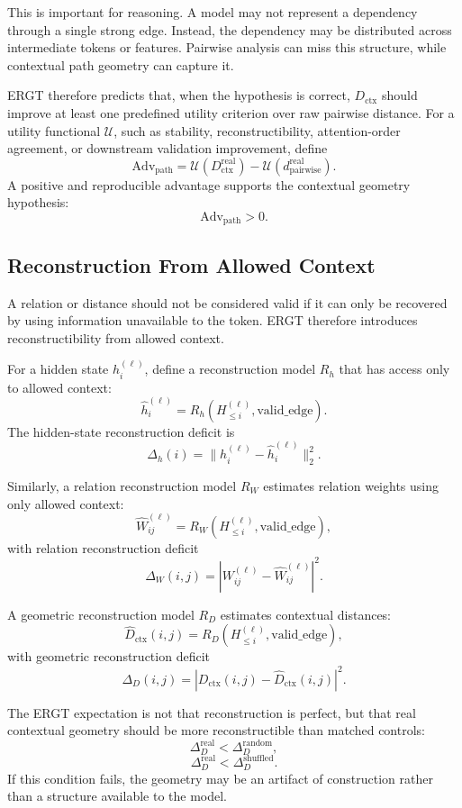 \documentclass[11pt]{article}
\begin{document}
This is important for reasoning. A model may not represent a dependency through a single strong edge. Instead, the dependency may be distributed across intermediate tokens or features. Pairwise analysis can miss this structure, while contextual path geometry can capture it.

ERGT therefore predicts that, when the hypothesis is correct, $D_{\mathrm{ctx}}$ should improve at least one predefined utility criterion over raw pairwise distance. For a utility functional $\mathcal{U}$, such as stability, reconstructibility, attention-order agreement, or downstream validation improvement, define
\[
\mathrm{Adv}_{\mathrm{path}}
=
\mathcal{U}(D_{\mathrm{ctx}}^{\mathrm{real}})
-
\mathcal{U}(d_{\mathrm{pairwise}}^{\mathrm{real}}).
\]
A positive and reproducible advantage supports the contextual geometry hypothesis:
\[
\mathrm{Adv}_{\mathrm{path}}>0.
\]

\subsection{Reconstruction From Allowed Context}

A relation or distance should not be considered valid if it can only be recovered by using information unavailable to the token. ERGT therefore introduces reconstructibility from allowed context.

For a hidden state $h_i^{(\ell)}$, define a reconstruction model $R_h$ that has access only to allowed context:
\[
\widehat{h}_i^{(\ell)}
=
R_h(H_{\leq i}^{(\ell)},\mathrm{valid\_edge}).
\]
The hidden-state reconstruction deficit is
\[
\Delta_h(i)
=
\|h_i^{(\ell)}-\widehat{h}_i^{(\ell)}\|_2^2.
\]

Similarly, a relation reconstruction model $R_W$ estimates relation weights using only allowed context:
\[
\widehat{W}_{ij}^{(\ell)}
=
R_W(H_{\leq i}^{(\ell)},\mathrm{valid\_edge}),
\]
with relation reconstruction deficit
\[
\Delta_W(i,j)
=
|W_{ij}^{(\ell)}-\widehat{W}_{ij}^{(\ell)}|^2.
\]

A geometric reconstruction model $R_D$ estimates contextual distances:
\[
\widehat{D}_{\mathrm{ctx}}(i,j)
=
R_D(H_{\leq i}^{(\ell)},\mathrm{valid\_edge}),
\]
with geometric reconstruction deficit
\[
\Delta_D(i,j)
=
|D_{\mathrm{ctx}}(i,j)-\widehat{D}_{\mathrm{ctx}}(i,j)|^2.
\]

The ERGT expectation is not that reconstruction is perfect, but that real contextual geometry should be more reconstructible than matched controls:
\[
\Delta_D^{\mathrm{real}}
<
\Delta_D^{\mathrm{random}},
\]
\[
\Delta_D^{\mathrm{real}}
<
\Delta_D^{\mathrm{shuffled}}.
\]
If this condition fails, the geometry may be an artifact of construction rather than a structure available to the model.
\end{document}
